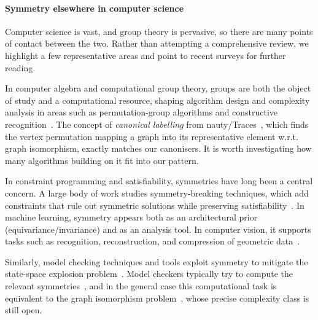 \paragraph{Symmetry elsewhere in computer science}

Computer science is vast, and group theory is pervasive, so there are
many points of contact between the two. Rather than attempting a
comprehensive review, we highlight a few representative areas and
point to recent surveys for further reading.

In computer algebra and computational group theory, groups are both
the object of study and a computational resource, shaping algorithm
design and complexity analysis in areas such as permutation-group
algorithms and constructive
recognition~\citep{Seress_2003,Holt2005HandbookOC}. The
concept of \emph{canonical labelling} from
nauty/Traces~\cite{MCKAY201494}, which finds the vertex permutation
mapping a graph into its representative element w.r.t. graph
isomorphism, exactly matches our canonisers. It is worth investigating
how many algorithms building on it fit into our \WLOG pattern.

In constraint programming and satisfiability, symmetries have long
been a central concern. A large body of work studies symmetry-breaking
techniques, which add constraints that rule out symmetric solutions
while preserving
satisfiability~\citep{DBLP:reference/fai/GentPP06,DBLP:conf/aaai/Walsh12,janota2025breakingsymmetriesquantifiedgraph}.
In machine learning, symmetry appears both as an
architectural prior (equivariance/invariance) and as an analysis
tool. In computer vision, it supports tasks such as
recognition, reconstruction, and compression of geometric
data~\citep{basheer2025symmetry,zhao2025symmetryneuralnetworkparameter,cornish2025stochasticneuralnetworksymmetrisation}.

Similarly, model checking techniques and tools exploit symmetry to
mitigate the state-space explosion problem~\cite{%
  clarke-jha:symmetry-and-induction-model-checking,%
  donaldson:thesis,%
  clarke2018handbook,%
  miller-donaldson-calder:symmetry-in-temporal-logic-model-checking,%
  sistla-godefroid:symmetry-and-reduced-symmetry-in-model-checking%
}. Model checkers typically try to compute the relevant symmetries~\citep[e.g.][]{
  wahl-d'silva:a-lazy-approach-to-symmetry-reduction,%
  chu-jaffar:a-complete-method-for-symmetry-reduction-in-safety-verification,%
  leuschel-et-al:symmetry-reduction-for-B-by-permutation-flooding,%
  wahl-damm-hermanns:adaptive-symmetry-reduction,%
  bosnacki-dams-holenderski:symmetric-spin%
},
and in the general case this computational task is equivalent to the
graph isomorphism problem~\cite{jha:thesis}, whose precise complexity
class is still open.

